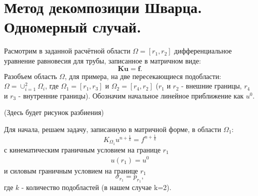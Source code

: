 \documentclass[a4paper,14pt]{extarticle}
\begin{document}

\section{Метод декомпозиции Шварца. Одномерный случай.}

Расмотрим в заданной расчётной области $\Omega=[r_1, r_2]$ дифференциальное уравнение равновесия для трубы, записанное в матричном виде:
\begin{equation}\label{SLAUStandart}
\textbf{Ku}=\textbf{f}.
\end{equation}
Разобъем область $\Omega$, для примера, на две пересекающиеся подобласти: $\Omega=\cup_{i=1}^{2} \Omega_{i}$, где $\Omega_1=[r_1, r_3]$ и $\Omega_2=[r_4, r_2]$ ($r_1$ и $r_2$ - внешние границы, $r_4$ и $r_3$ - внутренние границы). Обозначим начальное линейное приближение как $u^0$.

(Здесь будет рисунок разбиения)

Для начала, решаем задачу, записанную в матричной форме, в области $\Omega_{1}$:
\begin{equation}
K_{\Omega_{1}} u^{n+\frac{1}{k}} = f^{n+\frac{1}{k}}
\end{equation}
с кинематическим граничным условием на границе $r_1$
\begin{align*}
u(r_1)=u^0 
\end{align*}
и силовым граничным условием на границе $r_1$
\begin{equation}
\sigma_{r_1}=p_{r_1},
\end{equation}
где $k$ - количество подобластей (в нашем случае k=2). 
\end{document}
